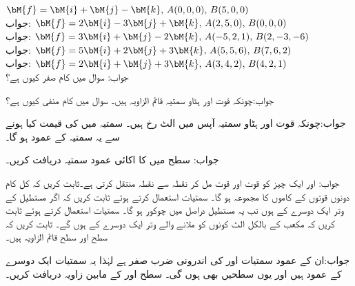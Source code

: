 \quad 
$\bM{f}=\bM{i}+\bM{j}-\bM{k},\, A(0,0,0),\, B(5,0,0)$\\
جواب:
\quad 
$\bM{f}=2\bM{i}-3\bM{j}+\bM{k},\, A(2,5,0),\, B(0,0,0)$\\
جواب:
\quad 
$\bM{f}=3\bM{i}+\bM{j}-2\bM{k},\, A(-5,2,1),\, B(2,-3,-6)$\\
جواب:
\quad 
$\bM{f}=5\bM{i}+2\bM{j}+3\bM{k},\, A(5,5,6),\, B(7,6,2)$\\
جواب:
\quad 
$\bM{f}=2\bM{i}+\bM{j}+3\bM{k},\, A(3,4,2),\, B(4,2,1)$\\
جواب:
سوال  میں کام صفر کیوں ہے؟

جواب:چونکہ قوت اور ہٹاو سمتیہ قائم الزاویہ ہیں۔
سوال  میں کام منفی کیوں ہے؟

جواب:چونکہ قوت اور ہٹاو سمتیہ آپس میں الٹ رخ ہیں۔
سمتیہ  میں  کی قیمت کیا ہونے سے یہ  سمتیہ  کے عمود ہو گا۔

جواب:
 سطح میں  کا اکائی عمود سمتیہ دریافت کریں۔

جواب: اور 
ایک چیز کو قوت  اور قوت  مل کر نقطہ  سے نقطہ  منتقل کرتی ہے۔ثابت کریں کہ کل کام دونوں قوتوں کے کاموں کا مجموعہ ہو گا۔
سمتیات استعمال کرتے ہوئے ثابت کریں کہ اگر مستطیل کے وتر  ایک دوسرے کے    ہوں تب یہ مستطیل دراصل میں چوکور ہو گا۔
سمتیات استعمال کرتے ہوئے ثابت کریں کہ مکعب کے بالکل الٹ کونوں کو ملانے والے  وتر  ایک دوسرے کے     ہوں گے۔
ثابت کریں کہ سطح  اور سطح  قائم الزاویہ ہیں۔

جواب:ان کے عمود سمتیات  اور  کی اندرونی ضرب صفر ہے لہٰذا یہ سمتیات  ایک دوسرے کے  عمود ہیں اور یوں  سطحیں بھی  ہوں گی۔
سطح  اور  کے مابین زاویہ دریافت کریں۔


